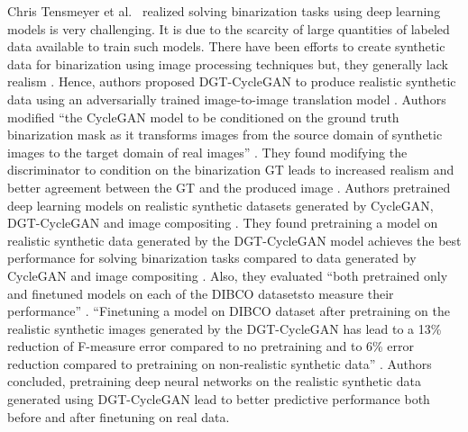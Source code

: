 Chris Tensmeyer et al.\ \cite{8978087} realized solving binarization tasks using deep learning models is very challenging. It is due to the scarcity of large quantities of labeled data available to train such models. There have been efforts to create synthetic data for binarization using image processing techniques but, they generally lack realism \cite{8978087}. Hence, authors proposed DGT-CycleGAN to produce realistic synthetic data using an adversarially trained image-to-image translation model \cite{8978087}. Authors modified ``the \ac{CycleGAN} model to be conditioned on the ground truth binarization mask as it transforms images from the source domain of synthetic images to the target domain of real images'' \cite{8978087}. They found modifying the discriminator to condition on the binarization \ac{GT} leads to increased realism and better agreement between the \ac{GT} and the produced image \cite{8978087}.  Authors pretrained deep learning models on realistic synthetic datasets generated by \ac{CycleGAN}, DGT-CycleGAN and image compositing \cite{8978087}. They found pretraining a model on realistic synthetic data generated by the DGT-CycleGAN model achieves the best performance for solving binarization tasks compared to data generated by \ac{CycleGAN} and image compositing \cite{8978087}. Also, they evaluated ``both pretrained only and finetuned models on each of the \ac{DIBCO} datasets\footnotemark to measure their performance'' \cite{8978087}. ``Finetuning a model on \ac{DIBCO} dataset after pretraining on the realistic synthetic images generated by the DGT-CycleGAN has lead to a 13\% reduction of F-measure error compared to no pretraining and to 6\% error reduction compared to pretraining on non-realistic synthetic data'' \cite{8978087}. Authors concluded, pretraining deep neural networks on the realistic synthetic data generated using DGT-CycleGAN lead to better predictive performance both before and after finetuning on real data.



